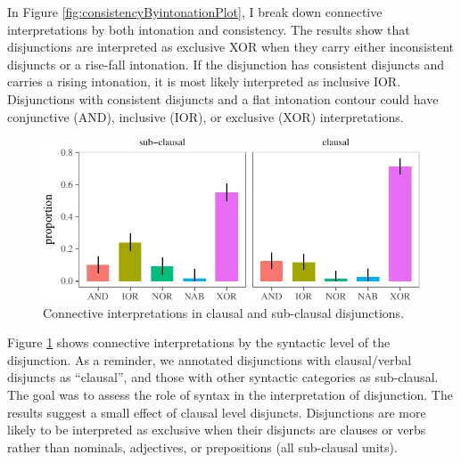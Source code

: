 \documentclass[oneside]{report}
\theoremstyle{definition}
\theoremstyle{definition}
\theoremstyle{definition}
\theoremstyle{remark}
\begin{document}
In Figure \ref{fig:consistencyByintonationPlot}, I break down connective
interpretations by both intonation and consistency. The results show
that disjunctions are interpreted as exclusive XOR when they carry
either inconsistent disjuncts or a rise-fall intonation. If the
disjunction has consistent disjuncts and carries a rising intonation, it
is most likely interpreted as inclusive IOR. Disjunctions with
consistent disjuncts and a flat intonation contour could have
conjunctive (AND), inclusive (IOR), or exclusive (XOR) interpretations.
\begin{figure}[tb]

{\centering \includegraphics{figs/syntaxPlot-1} 

}

\caption{Connective interpretations in clausal and sub-clausal disjunctions.}\label{fig:syntaxPlot}
\end{figure}
Figure \ref{fig:syntaxPlot} shows connective interpretations by the
syntactic level of the disjunction. As a reminder, we annotated
disjunctions with clausal/verbal disjuncts as ``clausal'', and those
with other syntactic categories as sub-clausal. The goal was to assess
the role of syntax in the interpretation of disjunction. The results
suggest a small effect of clausal level disjuncts. Disjunctions are more
likely to be interpreted as exclusive when their disjuncts are clauses
or verbs rather than nominals, adjectives, or prepositions (all
sub-clausal units).
\end{document}

